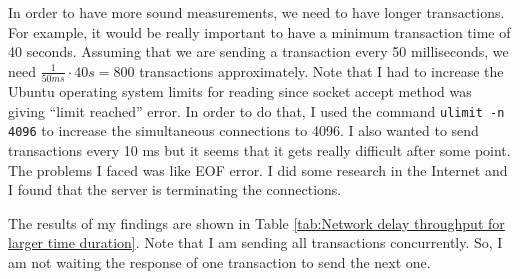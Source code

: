 \documentclass{article}
\begin{document}
In order to have more sound measurements, we need to have longer transactions. For example, it would be really important to have a minimum transaction time of 40 seconds. Assuming that we are sending a transaction every 50 milliseconds, we need $\frac{1}{50 ms} \cdot 40 s = 800$ transactions approximately. Note that I had to increase the Ubuntu operating system limits for reading since socket accept method was giving ``limit reached'' error. In order to do that, I used the command \texttt{ulimit -n 4096} to increase the simultaneous connections to 4096. I also wanted to send transactions every 10 ms but it seems that it gets really difficult after some point. The problems I faced was like EOF error. I did some research in the Internet and I found that the server is terminating the connections.

The results of my findings are shown in Table \ref{tab:Network delay throughput for larger time duration}. Note that I am sending all transactions concurrently. So, I am not waiting the response of one transaction to send the next one.
\end{document}
